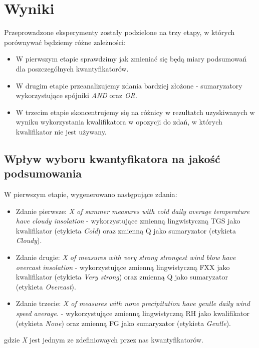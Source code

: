 \documentclass{classrep}
\begin{document}
\clearpage





\section{Wyniki}

Przeprowadzone eksperymenty zostały podzielone na trzy etapy, w których porównywać będziemy różne zależności:
\begin{itemize}[label=$\bullet$\scshape\bfseries]
\item W pierwszym etapie sprawdzimy jak zmieniać się będą miary podsumowań dla poszczególnych kwantyfikatorów.
\item W drugim etapie przeanalizujemy zdania bardziej złożone - sumaryzatory wykorzystujące spójniki \emph{AND} oraz \emph{OR}.
\item W trzecim etapie skoncentrujemy się na różnicy w rezultatch uzyskiwanych w wyniku wykorzystania kwalifikatora w opozycji do zdań, w których kwalifikator nie jest używany.
\end{itemize}


\subsection{Wpływ wyboru kwantyfikatora na jakość podsumowania}

W pierwszym etapie, wygenerowano następujące zdania:
\begin{itemize}[label=$\bullet$\scshape\bfseries]
\item Zdanie pierwsze: \textit{X of summer measures with cold daily average temperature have cloudy insolation} - wykorzystujące zmienną lingwistyczną TGS jako kwalifikator (etykieta \textit{Cold}) oraz zmienną Q jako sumaryzator (etykieta \textit{Cloudy}).
\item Zdanie drugie: \textit{X of measures with very strong strongest wind blow have overcast insolation} - wykorzystujące zmienną lingwistyczną FXX jako kwalifikator (etykieta \textit{Very strong}) oraz zmienną Q jako sumaryzator (etykieta \textit{Overcast}).
\item Zdanie trzecie: \textit{X of measures with none precipitation have gentle daily wind speed average.} - wykorzystujące zmienną lingwistyczną RH jako kwalifikator (etykieta \textit{None}) oraz zmienną FG jako sumaryzator (etykieta \textit{Gentle}).
\end{itemize}
gdzie \textit{X} jest jednym ze zdefiniowaych przez nas kwantyfikatorów.\newline
\end{document}
